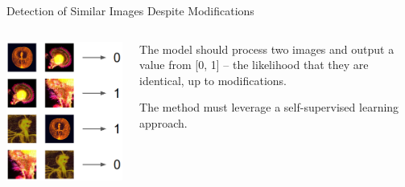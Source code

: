 \documentclass{beamer}
\begin{document}
\begin{frame}{Detection of Similar Images Despite Modifications}

\begin{columns}
    \begin{column}{0.42\textwidth}
        \includegraphics[width=1\textwidth]{fig/model-example.png}
    \end{column}
    \begin{column}{0.58\textwidth}
        The model should process two images and output a value from [0, 1] --
        the likelihood that they are identical, up to modifications.
        
        \bigskip
        The method must leverage a self-supervised learning approach.
    \end{column}
\end{columns}
\end{frame}

\end{document}
